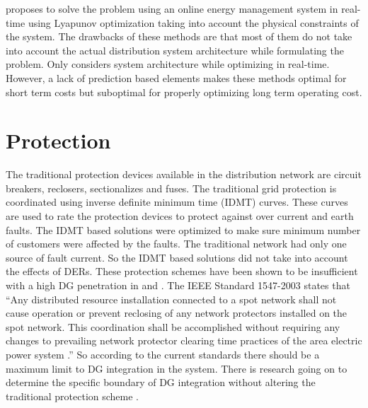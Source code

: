 \cite{Wen17} proposes to solve the problem using an online energy management system in real-time using Lyapunov optimization taking into account the physical constraints of the system.
The drawbacks of these methods are that most of them do not take into account the actual distribution system architecture while formulating the problem. Only \cite{Wen17} considers system architecture while optimizing in real-time. However, a lack of prediction based elements makes these methods optimal for short term costs but suboptimal for properly optimizing long term operating cost.


\section{Protection}
The traditional protection devices available in the distribution network are circuit breakers, reclosers, sectionalizes and fuses. The traditional grid protection is coordinated using inverse definite minimum time (IDMT) curves. These curves are used to rate the protection devices to protect against over current and earth faults. The IDMT based solutions were optimized to make sure minimum number of customers were affected by the faults. The traditional network had only one source of fault current. So the IDMT based solutions did not take into account the effects of DERs. These protection schemes have been shown to be insufficient with a high DG penetration in \cite{PR133} and \cite{PR134}. The IEEE Standard 1547-2003 states that
“Any distributed resource installation connected to a spot network shall not cause operation or prevent reclosing of any network protectors installed on the spot network. This coordination shall be accomplished without requiring any changes to prevailing network protector clearing time practices of the area electric power system \cite{PR135}.” 
So according to the current standards there should be a maximum limit to DG integration in the system. There is research going on to determine the specific boundary of DG integration without altering the traditional protection scheme \cite{PR136}. 
